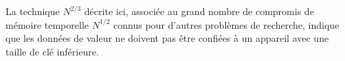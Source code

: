	La technique $N^{2/3}$ décrite ici, associée au grand nombre de compromis de mémoire temporelle $N^{1/2}$ connus pour d’autres problèmes de recherche, indique que les données de valeur ne doivent pas être confiées à un appareil avec une taille de clé inférieure.


\endinput{}
